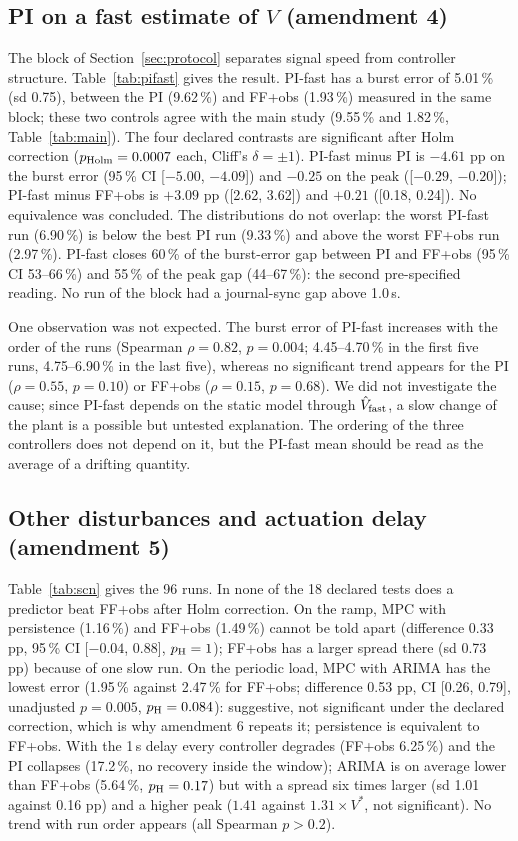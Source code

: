 \documentclass[smallextended]{svjour3}
\begin{document}
\subsection{PI on a fast estimate of $V$ (amendment 4)}\label{sec:pifast}
The block of Section~\ref{sec:protocol} separates signal speed from controller structure. Table~\ref{tab:pifast} gives the result. PI-fast has a burst error of 5.01\,\% (sd 0.75), between the PI (9.62\,\%) and FF+obs (1.93\,\%) measured in the same block; these two controls agree with the main study (9.55\,\% and 1.82\,\%, Table~\ref{tab:main}). The four declared contrasts are significant after Holm correction ($p_{\rm Holm}=0.0007$ each, Cliff's $\delta=\pm1$). PI-fast minus PI is $-4.61$ pp on the burst error (95\,\% CI [$-5.00$, $-4.09$]) and $-0.25$ on the peak ([$-0.29$, $-0.20$]); PI-fast minus FF+obs is $+3.09$ pp ([2.62, 3.62]) and $+0.21$ ([0.18, 0.24]). No equivalence was concluded. The distributions do not overlap: the worst PI-fast run (6.90\,\%) is below the best PI run (9.33\,\%) and above the worst FF+obs run (2.97\,\%). PI-fast closes 60\,\% of the burst-error gap between PI and FF+obs (95\,\% CI 53--66\,\%) and 55\,\% of the peak gap (44--67\,\%): the second pre-specified reading. No run of the block had a journal-sync gap above 1.0\,s.

One observation was not expected. The burst error of PI-fast increases with the order of the runs (Spearman $\rho=0.82$, $p=0.004$; 4.45--4.70\,\% in the first five runs, 4.75--6.90\,\% in the last five), whereas no significant trend appears for the PI ($\rho=0.55$, $p=0.10$) or FF+obs ($\rho=0.15$, $p=0.68$). We did not investigate the cause; since PI-fast depends on the static model through $\hat V_{\rm fast}$, a slow change of the plant is a possible but untested explanation. The ordering of the three controllers does not depend on it, but the PI-fast mean should be read as the average of a drifting quantity.

\subsection{Other disturbances and actuation delay (amendment 5)}\label{sec:scn}
Table~\ref{tab:scn} gives the 96 runs. In none of the 18 declared tests does a predictor beat FF+obs after Holm correction. On the ramp, MPC with persistence (1.16\,\%) and FF+obs (1.49\,\%) cannot be told apart (difference 0.33 pp, 95\,\% CI [$-0.04$, 0.88], $p_{\rm H}=1$); FF+obs has a larger spread there (sd 0.73 pp) because of one slow run. On the periodic load, MPC with ARIMA has the lowest error (1.95\,\% against 2.47\,\% for FF+obs; difference 0.53 pp, CI [0.26, 0.79], unadjusted $p=0.005$, $p_{\rm H}=0.084$): suggestive, not significant under the declared correction, which is why amendment 6 repeats it; persistence is equivalent to FF+obs. With the 1\,s delay every controller degrades (FF+obs 6.25\,\%) and the PI collapses (17.2\,\%, no recovery inside the window); ARIMA is on average lower than FF+obs (5.64\,\%, $p_{\rm H}=0.17$) but with a spread six times larger (sd 1.01 against 0.16 pp) and a higher peak ($1.41$ against $1.31\times V^*$, not significant). No trend with run order appears (all Spearman $p>0.2$).

\end{document}
